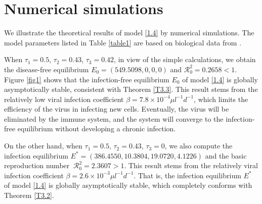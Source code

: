 \documentclass[reqno]{amsart}
\begin{document}
\section{Numerical simulations}

We illustrate the theoretical results of model \eqref{1.4} by numerical simulations. 
The model parameters listed in Table \ref{table1}
are based on biological data from \cite{DX,JX,SH}.

When $\tau_{1}=0.5$, $\tau_{2}=0.43$, $\tau_{3}=0.42$, in view of the simple 
calculations, we obtain the disease-free equilibrium $E_0=(549.5098, 0, 0, 0)$ and 
$\mathcal{R}_0^{2}=0.2658<1$.
Figure \ref{fig1} shows that the infection-free equilibrium $E_0$ of model 
\eqref{1.4} is globally asymptotically stable, consistent with Theorem \ref{T3.3}.
This result stems from the relatively low viral infection coefficient  
$\beta=7.8\times 10^{-4} \mu l^{-1} d^{-1}$,
 which limits the efficiency of the virus in infecting new cells. 
Eventually, the virus will be eliminated by the immune system, and the system 
will converge to the infection-free equilibrium without developing a chronic infection.

On the other hand, when $\tau_{1}=0.5$, $\tau_{2}=0.43$, $\tau_{3}=0$,  we  also 
compute the infection equilibrium $E^{*}=( 386.4550,10.3804, 19.0720,4.1226)$
and the basic reproduction number $\ \mathcal{R}_0^{2}=  2.3607>1$.  This
result stems from the relatively viral infection coefficient 
$\beta = 2.6 \times 10^{-3} \mu l^{-1} d^{-1}$. That is,
the infection equilibrium $E^{*}$ of model \eqref{1.4} is globally asymptotically 
stable, which completely conforms with  Theorem \ref{T3.2}.
 
\end{document}
